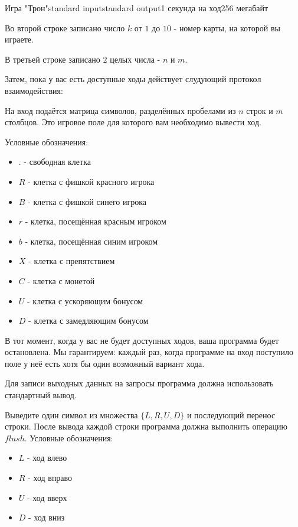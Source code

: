 \begin{problem}{Игра "Трон"}{standard input}{standard output}{1 секунда на ход}{256 мегабайт}
\par Во второй строке записано число $k$ от $1$ до $10$ - номер карты, на которой вы играете.

\par В третьей строке записано $2$ целых числа - $n$ и $m$.
\par Затем, пока у вас есть доступные ходы действует слудующий протокол взаимодействия:
        
\par На вход подаётся матрица символов, разделённых пробелами из $n$ строк и $m$ столбцов. Это игровое поле для которого вам необходимо вывести ход.
\par Условные обозначения:
\begin{itemize}
        \item$.$ - свободная клетка
        \item$R$ - клетка с фишкой красного игрока
        \item$B$ - клетка с фишкой синего игрока
        \item$r$ - клетка, посещённая красным игроком
        \item$b$ - клетка, посещённая синим игроком
        \item$X$ - клетка с препятствием
        \item$C$ - клетка с монетой
        \item$U$ - клетка с ускоряющим бонусом
        \item$D$ - клетка с замедляющим бонусом
\end{itemize}

\par В тот момент, когда у вас не будет доступных ходов, ваша программа будет остановлена. Мы гарантируем: каждый раз, когда
    программе на вход поступило поле у неё есть хотя бы один возможный вариант хода.

 
\OutputFile

\par Для записи выходных данных на запросы программа должна использовать стандартный вывод.

\par Выведите один символ из множества $\{ L, R, U, D \}$ и последующий перенос строки.
После вывода каждой строки программа должна выполнить операцию $flush$.
    Условные обозначения:
    \begin{itemize}
            \item$L$ - ход влево
            \item$R$ - ход вправо
            \item$U$ - ход вверх
            \item$D$ - ход вниз
    \end{itemize}
              

\end{problem}
